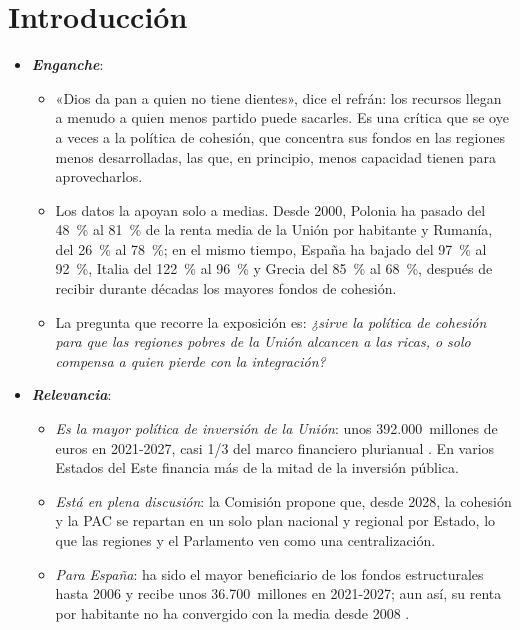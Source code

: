 \documentclass[11pt]{article}
\begin{document}
\tceetitulo


\section*{Introducción}

\begin{itemize}
\item \textbf{\emph{Enganche}}:
  \begin{itemize}
  \item «Dios da pan a quien no tiene dientes», dice el refrán: los recursos llegan a menudo a quien menos partido puede sacarles. Es una crítica que se oye a veces a la política de cohesión, que concentra sus fondos en las regiones menos desarrolladas, las que, en principio, menos capacidad tienen para aprovecharlos.
  \item Los datos la apoyan solo a medias. Desde 2000, Polonia ha pasado del 48~\% al 81~\% de la renta media de la Unión por habitante y Rumanía, del 26~\% al 78~\%; en el mismo tiempo, España ha bajado del 97~\% al 92~\%, Italia del 122~\% al 96~\% y Grecia del 85~\% al 68~\%, después de recibir durante décadas los mayores fondos de cohesión\nocite{Eurostat2026PPA}.
  \item La pregunta que recorre la exposición es: \emph{¿sirve la política de cohesión para que las regiones pobres de la Unión alcancen a las ricas, o solo compensa a quien pierde con la integración?}
  \end{itemize}

\item \textbf{\emph{Relevancia}}:
  \begin{itemize}
  \item \emph{Es la mayor política de inversión de la Unión}: unos 392.000~millones de euros en 2021-2027, casi 1/3 del marco financiero plurianual\nocite{CE2026Cohesiondata} . En varios Estados del Este financia más de la mitad de la inversión pública.
  \item \emph{Está en plena discusión}: la Comisión propone que, desde 2028, la cohesión y la PAC se repartan en un solo plan nacional y regional por Estado, lo que las regiones y el Parlamento ven como una centralización\nocite{CE2025PropuestaFondo}.
  \item \emph{Para España}: ha sido el mayor beneficiario de los fondos estructurales hasta 2006 y recibe unos 36.700~millones en 2021-2027; aun así, su renta por habitante no ha convergido con la media desde 2008\nocite{CE2018Panorama64,CE2026Cohesiondata,Eurostat2026PPA}  .
  \end{itemize}


\end{itemize}
\end{document}
